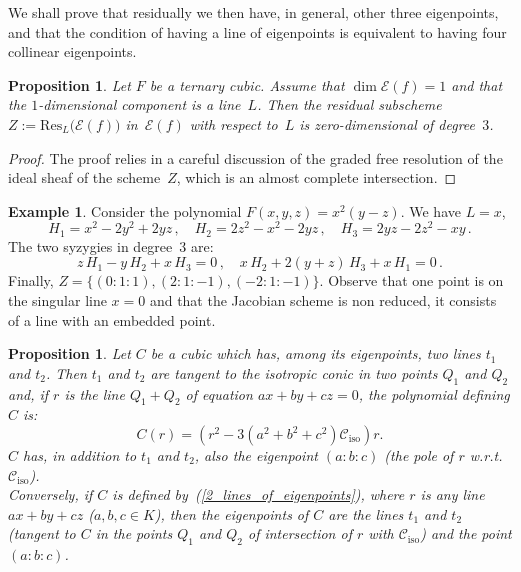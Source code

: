 \documentclass[11pt, a4paper, reqno, captions=tableheading,bibliography=totoc]{scrartcl}
\theoremstyle{plain}
\newtheorem{prop}[lemma]{Proposition}
\theoremstyle{definition}
\newtheorem{es}[lemma]{Example}
\newcommand{\iso}{\mathcal{C}_{\mathrm{iso}}}
\newcommand{\Eig}[1]{\mathcal{E}\!\left( {#1} \right)}
\begin{document}
We shall prove that residually we then have, in general, other three eigenpoints, and that the condition of having a line of eigenpoints is equivalent to having four collinear eigenpoints.

\begin{prop}
\label{p2}
Let $F$ be a ternary cubic.
Assume that $\dim \Eig{f} = 1$ and that the $1$-dimensional component is a line~$L$.
Then the residual subscheme $Z := \mathrm{Res}_L \bigl( \Eig{f} \bigr)$ in~$\Eig{f}$ with respect to~$L$ is zero-dimensional of degree~$3$.
\end{prop}
\begin{proof}
The proof relies in a careful discussion of the graded free resolution of the ideal sheaf of the scheme~$Z$, which is an almost complete intersection.
\end{proof}

\begin{es}
Consider the polynomial $F(x, y, z) = x^2 (y - z)$.
We have $L = x$,
%
\[
 H_1 = x^2-2y^2+2y z \,,
 \quad
 H_2 = 2z^2-x^2-2y z \,,
 \quad
 H_3 = 2yz-2z^2-xy \,.
\]
%
The two syzygies in degree~$3$ are:
%
\[
 z \, H_1 - y \, H_2 + x \, H_3 = 0 \,,
 \quad
 x \, H_2 + 2(y+z) \, H_3 + x \, H_1 = 0 \,.
\]
%
Finally, $Z = \bigl\{ (0:1:1), (2:1:-1), (-2:1:-1) \bigr\}$. Observe that one point is on the singular line $x = 0$
and that the Jacobian scheme is non reduced, it consists of a line with an embedded point.
\end{es}

\begin{prop}
\label{cubiche_con_2_rette}
Let $C$ be a cubic which has, among its eigenpoints, two lines $t_1$
and $t_2$. Then $t_1$ and $t_2$ are tangent to the isotropic conic
in two points $Q_1$ and $Q_2$ and, if $r$ is the line $Q_1+Q_2$
of equation $ax+by+cz=0$, the polynomial defining $C$ is:
\begin{equation}
C(r) = \left(r^2-3\left(a^2+b^2+c^2\right)\iso\right)r.
\label{2_lines_of_eigenpoints}
\end{equation}
$C$ has, in addition to $t_1$ and $t_2$, also the eigenpoint $(a: b: c)$
(the pole of $r$ w.r.t.\ $\iso$). \\
Conversely, if $C$ is defined by~(\ref{2_lines_of_eigenpoints}), where
$r$ is any line $ax+by+cz$ ($a, b, c \in K$), then
the eigenpoints of $C$ are the lines $t_1$ and $t_2$ (tangent to $C$
in the points $Q_1$ and $Q_2$ of intersection of $r$ with $\iso$) and
the point $(a: b: c)$.
\end{prop}
\end{document}
